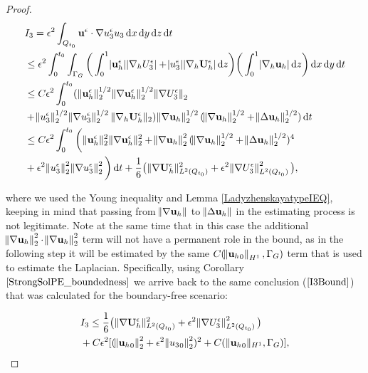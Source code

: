 \documentclass[11pt]{article}
\newcommand*\diff{\mathop{}\!\mathrm{d}}
\begin{document}
\begin{proof}
  \begin{equation}
    \begin{split}
      & I_3 = \epsilon^2 \int_{Q_{t_0}} \mathbf{u}^\epsilon \cdot \nabla u_3^\epsilon u_3 \diff x \diff y \diff z \diff t \\
      & \leq \epsilon^2 \int_0^{t_0} \int_{\Gamma_G} \bigg ( \int_0^1 \abs{\mathbf{u}_h^\epsilon} \abs{\nabla_h U_3^\epsilon} + \abs{u_3^\epsilon} \abs{\nabla_h \mathbf{U}_h^\epsilon}\diff z \bigg) \bigg ( \int_0^1 \abs{\nabla_h \mathbf{u}_h}  \diff z \bigg ) \diff x \diff y \diff t \\
      & \leq C \epsilon^2 \int_0^{t_0} ( \| \mathbf{u}_h^\epsilon \| _2^{1/2} \| \nabla\mathbf{u}_h^\epsilon \| _2^{1/2} \norm{\nabla U_3^\epsilon}_2 \\
      & + \norm{u_3^\epsilon}_2^{1/2} \norm{\nabla u_3^\epsilon}_2^{1/2} \| \nabla_h \mathbf{U}_h^\epsilon \|_2) \norm{\nabla \mathbf{u}_h }_2^{1/2} (\norm{\nabla \mathbf{u}_h}_2^{1/2} + \norm{\Delta \mathbf{u}_h}_2^{1/2}) \diff t \\
      & \leq C \epsilon^2 \int_0 ^ {t_0} \bigg ( \| \mathbf{u}_h^\epsilon \| _2^2 \| \nabla \mathbf{u}_h^\epsilon \|_2^2 + \norm{\nabla \mathbf{u}_h}_2^2 (\norm{\nabla \mathbf{u}_h}_2^{1/2} + \norm{\Delta \mathbf{u}_h}_2^{1/2})^4 \\
      & + \epsilon^2 \norm{u_3^\epsilon}_2^2 \norm{\nabla u_3^\epsilon}_2^2 \bigg ) \diff t + \frac{1}{6} \big ( \| \nabla \mathbf{U}_h^\epsilon \|_{L^2(Q_{t_0})}^2 + \epsilon^2 \norm{\nabla U_3^\epsilon}_{L^2(Q_{t_0})}^2  \big),
    \end{split}
  \end{equation}
  
  where we used the Young inequality and Lemma \ref{LadyzhenskayatypeIEQ}, keeping in mind that passing from $\norm{\nabla \mathbf{u}_h}$ to $\norm{\Delta \mathbf{u}_h}$ in the estimating process is not legitimate. Note at the same time that in this case the additional $\norm{\nabla \mathbf{u}_h}_2^2 \cdot \norm{\nabla \mathbf{u}_h}_2^2$ term will not have a permanent role in the bound, as in the following step it will be estimated by the same $C(\norm{{\mathbf{u}_h}_0}_{H^1}, \Gamma_G)$ term that is used to estimate the Laplacian. Specifically, using Corollary $\ref{StrongSolPE_boundedness}$ we arrive back to the same conclusion ($\ref{I3Bound}$) that was calculated for the boundary-free scenario:

  \begin{equation} \label{I3Bound}
    \begin{split}
      & I_3 \leq \frac{1}{6} \big (  \| \nabla \mathbf{U}_h^\epsilon \| _{L^2(Q_{t_0})}^2 + \epsilon^2 \norm{\nabla U_3^\epsilon}_{L^2(Q_{t_0})}^2 \big )\\
      & + C \epsilon^2 [(\norm{{\mathbf{u}_h}_0}_2^2 + \epsilon^2 \norm{{u_3}_0}_2^2)^2 + C( \| {\mathbf{u}_h}_0 \| _{H^1}, \Gamma_G)],
    \end{split}
  \end{equation}
  

\end{proof}
\end{document}

